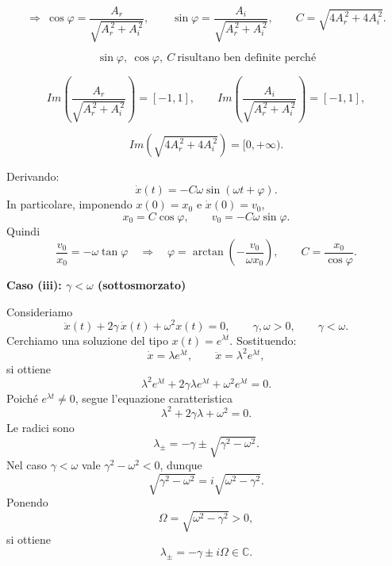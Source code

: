 \[
\Rightarrow\
\cos\varphi=\frac{A_r}{\sqrt{A_r^{\,2}+A_i^{\,2}}},
\qquad
\sin\varphi=\frac{A_i}{\sqrt{A_r^{\,2}+A_i^{\,2}}},
\qquad
C=\sqrt{4A_r^{\,2}+4A_i^{\,2}}.
\]

\[
\sin\varphi,\ \cos\varphi,\ C\ \text{risultano ben definite perché}
\]

\[
Im\!\left(\frac{A_r}{\sqrt{A_r^{\,2}+A_i^{\,2}}}\right)=[-1,1],
\qquad
Im\!\left(\frac{A_i}{\sqrt{A_r^{\,2}+A_i^{\,2}}}\right)=[-1,1],
\]

\[
Im\!\left(\sqrt{4A_r^{\,2}+4A_i^{\,2}}\right)=[0,+\infty).
\]

Derivando:
\[
\dot x(t)=-C\omega \sin(\omega t+\varphi).
\]
In particolare, imponendo \(x(0)=x_0\) e \(\dot x(0)=v_0\),
\[
x_0=C\cos\varphi,
\qquad
v_0=-C\omega\sin\varphi.
\]
Quindi
\[
\frac{v_0}{x_0}=-\omega\tan\varphi
\quad\Rightarrow\quad
\varphi=\arctan\!\left(-\frac{v_0}{\omega x_0}\right),
\qquad
C=\frac{x_0}{\cos\varphi}.
\]

\begin{center}
\end{center}




\textbf{Caso (iii): \(\gamma<\omega\) (sottosmorzato)}

Consideriamo
\[
\ddot x(t)+2\gamma\,\dot x(t)+\omega^2 x(t)=0,
\qquad \gamma,\omega>0,
\qquad \gamma<\omega.
\]
Cerchiamo una soluzione del tipo \(x(t)=e^{\lambda t}\). Sostituendo:
\[
\dot x=\lambda e^{\lambda t},\qquad \ddot x=\lambda^2 e^{\lambda t},
\]
si ottiene
\[
\lambda^2 e^{\lambda t}+2\gamma\lambda e^{\lambda t}+\omega^2 e^{\lambda t}=0.
\]
Poiché \(e^{\lambda t}\neq 0\), segue l'equazione caratteristica
\[
\lambda^2+2\gamma\lambda+\omega^2=0.
\]
Le radici sono
\[
\lambda_{\pm}=-\gamma\pm\sqrt{\gamma^2-\omega^2}.
\]
Nel caso \(\gamma<\omega\) vale \(\gamma^2-\omega^2<0\), dunque
\[
\sqrt{\gamma^2-\omega^2}=i\sqrt{\omega^2-\gamma^2}.
\]
Ponendo
\[
\Omega=\sqrt{\omega^2-\gamma^2}>0,
\]
si ottiene
\[
\lambda_{\pm}=-\gamma\pm i\Omega\in\mathbb{C}.
\]

